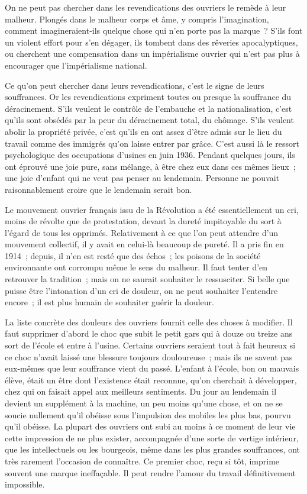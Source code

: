 \documentclass[french,twoside]{book} %
\begin{document}
On ne peut pas chercher dans les revendications des ouvriers le remède à leur malheur. Plongés dans le malheur corps et âme, y compris l'imagination, comment imagineraient-ils quelque chose qui n'en porte pas la marque ? S'ils font un violent effort pour s'en dégager, ils tombent dans des rêveries apocalyptiques, ou cherchent une compensation dans un impérialisme ouvrier qui n'est pas plus à encourager que l'impérialisme national.\par
Ce qu'on peut chercher dans leurs revendications, c'est le signe de leurs souffrances. Or les revendications expriment toutes ou presque la souffrance du déracinement. S'ils veulent le contrôle de l'embauche et la nationalisation, c'est qu'ils sont obsédés par la peur du déracinement total, du chômage. S'ils veulent abolir la propriété privée, c'est qu'ils en ont assez d'être admis sur le lieu du travail comme des immigrés qu'on laisse entrer par grâce. C'est aussi là le ressort psychologique des occupations d'usines en juin 1936. Pendant quelques jours, ils ont éprouvé une joie pure, sans mélange, à être chez eux dans ces mêmes lieux ; une joie d'enfant qui ne veut pas penser au lendemain. Personne ne pouvait raisonnablement croire que le lendemain serait bon.\par
Le mouvement ouvrier français issu de la Révolution a été essentiellement un cri, moins de révolte que de protestation, devant la dureté impitoyable du sort à l'égard de tous les opprimés. Relativement à ce que l'on peut attendre d'un mouvement collectif, il y avait en celui-là beaucoup de pureté. Il a pris fin en 1914 ; depuis, il n'en est resté que des échos ; les poisons de la société environnante ont corrompu même le sens du malheur. Il faut tenter d'en retrouver la tradition ; mais on ne saurait souhaiter le ressusciter. Si belle que puisse être l'intonation d'un cri de douleur, on ne peut souhaiter l'entendre encore ; il est plus humain de souhaiter guérir la douleur.\par
La liste concrète des douleurs des ouvriers fournit celle des choses à modifier. Il faut supprimer d'abord le choc que subit le petit gars qui à douze ou treize ans sort de l'école et entre à l'usine. Certains ouvriers seraient tout à fait heureux si ce choc n'avait laissé une blessure toujours douloureuse ; mais ils ne savent pas eux-mêmes que leur souffrance vient du passé. L'enfant à l'école, bon ou mauvais élève, était un être dont l'existence était reconnue, qu'on cherchait à développer, chez qui on faisait appel aux meilleurs sentiments. Du jour au lendemain il devient un supplément à la machine, un peu moins qu'une chose, et on ne se soucie nullement qu'il obéisse sous l'impulsion des mobiles les plus bas, pourvu qu'il obéisse. La plupart des ouvriers ont subi au moins à ce moment de leur vie cette impression de ne plus exister, accompagnée d'une sorte de vertige intérieur, que les intellectuels ou les bourgeois, même dans les plus grandes souffrances, ont très rarement l'occasion de connaître. Ce premier choc, reçu si tôt, imprime souvent une marque ineffaçable. Il peut rendre l'amour du travail définitivement impossible.\par
\end{document}
